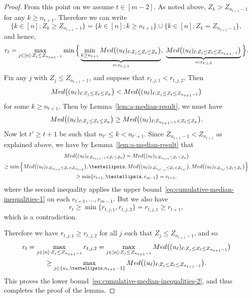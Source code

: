 \documentclass[10pt,a4paper]{amsart}
\begin{document}
\begin{proof}
From this point on we assume $t\in[m-2]$. 
As noted above, $Z_k > Z_{n_{t+1}-1}$ for any $k\geq n_{t+1}$. 
Therefore we can write
\[
\{k\in[n]: Z_k \geq Z_{n_{t+1}-1}\} = \{k\in[n]: k\geq n_{t+1}\} \cup \{k\in[n]: Z_k = Z_{n_{t+1}-1}\},
\]
and hence,
\[
r_t = \max_{j\in[n]:Z_j \leq Z_{n_{t+1}-1}}\min\Big\{\underbrace{\min_{k\geq n_{t+1}}\textnormal{Med}\bigl((u_\ell)_{\ell:Z_j\leq Z_\ell\leq Z_k}\bigr)}_{=:r_{t,j,1}} , \ \underbrace{ \textnormal{Med}\bigl((u_\ell)_{\ell:Z_j\leq Z_\ell\leq Z_{n_{t+1}-1}}\bigr)}_{=:r_{t,j,2}}\Big\}.
\]
Fix any $j$ with $Z_j \leq Z_{n_{t+1}-1}$, and suppose that $r_{t,j,1} < r_{t,j,2}$. Then
\[
\textnormal{Med}\bigl((u_\ell)_{\ell:Z_j\leq Z_\ell\leq Z_k}\bigr) < \textnormal{Med}\bigl((u_\ell)_{\ell:Z_j\leq Z_\ell\leq Z_{n_{t+1}-1}}\bigr)
\]
for some $k\geq n_{t+1}$. Then by Lemma~\ref{lem:a-median-result}, we must have
 \[\textnormal{Med}\bigl((u_\ell)_{\ell:Z_j\leq Z_\ell\leq Z_k}\bigr) \geq \textnormal{Med}\bigl((u_\ell)_{\ell:Z_{n_{t+1}-1}< Z_\ell\leq Z_k}\bigr).\]
Now let $t' \geq t+1$ be such that $n_{t'}\leq k < n_{t'+1}$.  Since $Z_{n_{t+1}-1} < Z_{n_{t+1}}$ as explained above, we have by Lemma~\ref{lem:a-median-result} that 
\begin{multline*}
\textnormal{Med}\bigl((u_\ell)_{\ell:Z_{n_{t+1}-1}< Z_\ell\leq Z_k}\bigr) = \textnormal{Med}\bigl((u_\ell)_{\ell:Z_{n_{t+1}}\leq Z_\ell\leq Z_k}\bigr) \\\geq \min\left\{\textnormal{Med}\bigl((u_\ell)_{\ell:Z_{n_{t+1}}\leq Z_\ell < Z_{n_{t+2}}}\bigr), \dots,\textnormal{Med}\bigl((u_\ell)_{\ell:Z_{n_{t'-1}}\leq Z_\ell < Z_{n_{t'}}}\bigr),\textnormal{Med}\bigl((u_\ell)_{\ell:Z_{n_{t'}}\leq Z_\ell \leq Z_k}\bigr)\right\}\\\geq \min\{r_{t+1},\dots,r_{m-1}\} = r_{t+1},
\end{multline*}
where the second inequality applies the upper bound~\eqref{eq:cumulative-median-inequalities-1} on each $r_{t+1},\dots,r_{m-1}$. But we also have
\[
r_t \geq \min\{r_{t,j,1},r_{t,j,2}\} = r_{t,j,1} \geq r_{t+1},
\]
which is a contradiction.

Therefore we have $r_{t,j,1}\geq r_{t,j,2}$ for all $j$ such that $Z_j \leq Z_{n_{t+1}-1}$, and so
\begin{multline*}
r_t = \max_{j\in[n]:Z_j \leq Z_{n_{t+1}-1}}r_{t,j,2} = \max_{j\in[n]:Z_j \leq Z_{n_{t+1}-1}} \textnormal{Med}\bigl((u_\ell)_{\ell:Z_j\leq Z_\ell\leq Z_{n_{t+1}-1}}\bigr) \\\geq \max_{j\in\{n_t,\dots,n_{t+1}-1\}}\textnormal{Med}\bigl((u_\ell)_{\ell:Z_j\leq Z_\ell\leq Z_{n_{t+1}-1}}\bigr).
\end{multline*}
This proves the lower bound~\eqref{eq:cumulative-median-inequalities-2}, and thus completes the proof of the lemma.
\end{proof}
\end{document}
